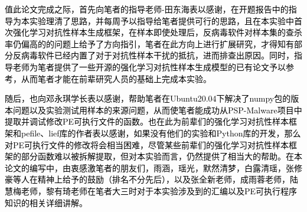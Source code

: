 
\begin{acknowledgements}

\textcolor{black}{值此论文完成之际，首先向笔者的指导老师-田东海表以感谢，在开题报告中的指导为本实验理清了思路，并每周予以指导给笔者提供可行的思路，且在本实验中首次强化学习对抗性样本生成框架，在样本即使处理后，反病毒软件对样本集的查杀率仍偏高的的问题上给予了方向指引，笔者在此方向上进行扩展研究，才得知有部分反病毒软件已经内置了对于对抗性样本干扰的抵抗，进而排查出原因。同时，指导老师为笔者提供了一些开源的强化学习对抗性样本生成模型的已有论文予以参考，从而笔者才能在前辈研究人员的基础上完成本实验。}

\textcolor{black}{随后，也向邓永琪学长表以感谢，帮助笔者在Ubuntu20.04下解决了numpy包的版本问题以及实验测试用样本的来源问题，从而使笔者能成功从PSP-Malware项目中提取并调试修改PE可执行文件的函数。也在此为前辈们的强化学习对抗性样本框架和pefile、lief库的作者表以感谢，如果没有他们的实验和Python库的开发，那么对PE可执行文件的修改将会相当困难，尽管某些前辈们的强化学习对抗性样本框架的部分函数难以被拆解提取，但对本实验而言，仍然提供了相当大的帮助。在本论文的编写中，由衷感激笔者的朋友们，雨涵，瑶光，默然清梦，白露清瑶，张修豪等人在精神上给予的鼓励（排名不分先后），以及张全新老师，成雨蓉老师，陆慧梅老师，黎有琦老师在笔者大三时对于本实验涉及到的汇编以及PE可执行程序知识的相关详细讲解。}

\end{acknowledgements}
